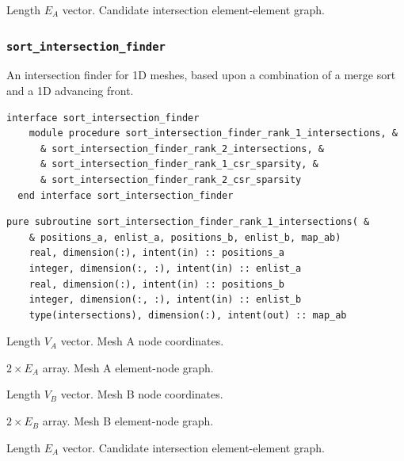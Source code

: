 \documentclass{article}
\begin{document}
\begin{description}[font=\ttfamily\bfseries,leftmargin=2.2\parindent,labelindent=1.7\parindent,noitemsep]
  \item[ints] Length $E_A$ vector. Candidate intersection element-element graph.
\end{description}

\subsubsection{\texttt{sort\_intersection\_finder}}\label{sect:sort_global}

An intersection finder for 1D meshes, based upon a combination of a merge sort
and a 1D advancing front.

\begin{lstlisting}[language=FORTRAN]
  interface sort_intersection_finder
    module procedure sort_intersection_finder_rank_1_intersections, &
      & sort_intersection_finder_rank_2_intersections, &
      & sort_intersection_finder_rank_1_csr_sparsity, &
      & sort_intersection_finder_rank_2_csr_sparsity
  end interface sort_intersection_finder
\end{lstlisting}

\begin{lstlisting}[language=FORTRAN]
  pure subroutine sort_intersection_finder_rank_1_intersections( &
    & positions_a, enlist_a, positions_b, enlist_b, map_ab)
    real, dimension(:), intent(in) :: positions_a
    integer, dimension(:, :), intent(in) :: enlist_a
    real, dimension(:), intent(in) :: positions_b
    integer, dimension(:, :), intent(in) :: enlist_b
    type(intersections), dimension(:), intent(out) :: map_ab
\end{lstlisting}

\begin{description}[font=\ttfamily\bfseries,leftmargin=2.2\parindent,labelindent=1.7\parindent,noitemsep]
  \item[positions\_a] Length $V_A$ vector. Mesh A node coordinates.
  \item[enlist\_a] $2 \times E_A$ array. Mesh A element-node graph.
  \item[positions\_b] Length $V_B$ vector. Mesh B node coordinates.
  \item[enlist\_b] $2 \times E_B$ array. Mesh B element-node graph.
  \item[map\_ab] Length $E_A$ vector. Candidate intersection element-element
    graph.
\end{description}
\end{document}
